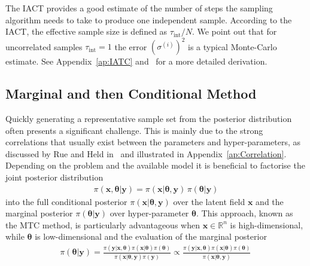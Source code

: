 The IACT provides a good estimate of the number of steps the sampling algorithm needs to take to produce one independent sample.
According to the IACT, the effective sample size is defined as $ \tau_{\text{int}} /N$.
We point out that for uncorrelated samples $\tau_{\text{int}} = 1$ the error $(\sigma^{(i)})^2$ is a typical Monte-Carlo estimate.
See Appendix~\ref{ap:IATC} and~\cite{Sokal1997, wolff2004monte, wolff2002LecNot} for a more detailed derivation.

\subsection{Marginal and then Conditional Method}
\label{subsec:TheoMTC}
Quickly generating a representative sample set from the posterior distribution often presents a significant challenge. %
This is mainly due to the strong correlations that usually exist between the parameters and hyper-parameters, as discussed by Rue and Held in~\cite{rue2005gaussian} and illustrated in Appendix~\ref{ap:Correlation}.
Depending on the problem and the available model it is beneficial to factorise the joint posterior distribution
\begin{align}
	\pi(\bm{x}, \bm{\theta} |  \bm{y}) = \pi(\bm{x} |  \bm{\theta}, \bm{y}) \, \pi(\bm{\theta} |   \bm{y}) \label{eq:MTC}
\end{align}
into the full conditional posterior $\pi(\bm{x} |  \bm{\theta}, \bm{y})$ over the latent field $\bm{x}$ and the marginal posterior $ \pi(\bm{\theta} |   \bm{y})$ over hyper-parameter $\bm{\theta}$.
This approach, known as the MTC method, is particularly advantageous when $\bm{x}\in \mathbb{R}^n$ is high-dimensional, while $\bm{\theta}$ is low-dimensional and the evaluation of the marginal posterior
\begin{align}
	\pi(\bm{\theta} |   \bm{y}) =  \frac{ \pi(   \bm{y} | \bm{x},\bm{\theta})  \pi( \bm{x} | \bm{\theta} )  \pi(\bm{\theta}) }{ \pi(\bm{x} | \bm{\theta} ,   \bm{y})   \pi( \bm{y})} \propto \frac{ \pi(   \bm{y} | \bm{x},\bm{\theta})  \pi( \bm{x} | \bm{\theta} )  \pi(\bm{\theta}) }{ \pi(\bm{x} | \bm{\theta} ,   \bm{y}) } \label{eq:margGen}\, 
\end{align}
